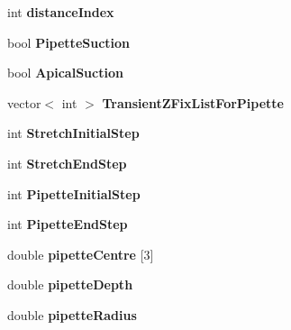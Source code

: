 \begin{DoxyCompactItemize}
\item 
\hypertarget{classSimulation_ac21ce1a13eb2eedd549a1f61232b948b}{}int {\bfseries distance\+Index}\label{classSimulation_ac21ce1a13eb2eedd549a1f61232b948b}

\item 
\hypertarget{classSimulation_a10cfa63b384b954f5ea34afca788f298}{}bool {\bfseries Pipette\+Suction}\label{classSimulation_a10cfa63b384b954f5ea34afca788f298}

\item 
\hypertarget{classSimulation_a53d18b41ab9318966acb05815ab4deb0}{}bool {\bfseries Apical\+Suction}\label{classSimulation_a53d18b41ab9318966acb05815ab4deb0}

\item 
\hypertarget{classSimulation_a614017cf64e201c1897117b6ce31e17c}{}vector$<$ int $>$ {\bfseries Transient\+Z\+Fix\+List\+For\+Pipette}\label{classSimulation_a614017cf64e201c1897117b6ce31e17c}

\item 
\hypertarget{classSimulation_a973663e403ae2b5596f10f7933111c93}{}int {\bfseries Stretch\+Initial\+Step}\label{classSimulation_a973663e403ae2b5596f10f7933111c93}

\item 
\hypertarget{classSimulation_a4549e150051a2d4c7e9bb5d7c8194131}{}int {\bfseries Stretch\+End\+Step}\label{classSimulation_a4549e150051a2d4c7e9bb5d7c8194131}

\item 
\hypertarget{classSimulation_ab3f29a12d0630213fe58e14a0e198ca0}{}int {\bfseries Pipette\+Initial\+Step}\label{classSimulation_ab3f29a12d0630213fe58e14a0e198ca0}

\item 
\hypertarget{classSimulation_a7382cfd6abf17a8067e86cabf68f512f}{}int {\bfseries Pipette\+End\+Step}\label{classSimulation_a7382cfd6abf17a8067e86cabf68f512f}

\item 
\hypertarget{classSimulation_a80ba175cfd0377ddab49a0058139f03c}{}double {\bfseries pipette\+Centre} \mbox{[}3\mbox{]}\label{classSimulation_a80ba175cfd0377ddab49a0058139f03c}

\item 
\hypertarget{classSimulation_a6d987f6569d306688d272436294e85f4}{}double {\bfseries pipette\+Depth}\label{classSimulation_a6d987f6569d306688d272436294e85f4}

\item 
\hypertarget{classSimulation_a44f9a496fd5dcdb27e7e425350cfa5ae}{}double {\bfseries pipette\+Radius}\label{classSimulation_a44f9a496fd5dcdb27e7e425350cfa5ae}


\end{DoxyCompactItemize}
